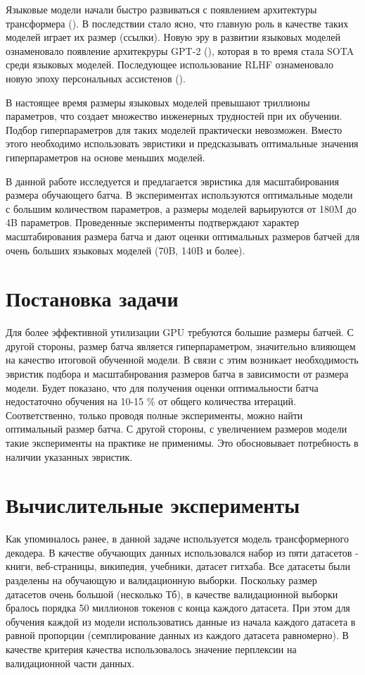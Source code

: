 \documentclass{article}
\begin{document}
\quad Языковые модели начали быстро развиваться с появлением архитектуры трансформера (\cite{vaswani2017attention}). В последствии стало ясно, что главную роль в качестве таких моделей играет их размер (ссылки). Новую эру в развитии языковых  моделей ознаменовало появление архитекруры GPT-2 (\cite{radford2019language}), которая в то время стала SOTA среди языковых моделей. Последующее использование RLHF ознаменовало новую эпоху персональных ассистенов (\cite{ouyang2022training}).


\quad В настоящее время размеры языковых моделей превышают триллионы параметров, что создает множество инженерных трудностей при их обучении. Подбор гиперпараметров для таких моделей практически невозможен. Вместо этого необходимо использовать эвристики и предсказывать оптимальные значения гиперпараметров на основе меньших моделей.

\quad В данной работе исследуется и предлагается эвристика для масштабирования размера обучающего батча. В экспериментах используются оптимальные модели с большим количеством параметров, а размеры моделей варьируются от 180M до 4B параметров. Проведенные эксперименты подтверждают характер масштабирования размера батча и дают оценки оптимальных размеров батчей для очень больших языковых моделей (70B, 140B и более).


\section{Постановка задачи}
\label{sec:headings}
Для более эффективной утилизации GPU требуются большие размеры батчей. С другой стороны, размер батча является гиперпараметром, значительно влияющем на качество итоговой обученной модели. В связи с этим возникает необходимость эвристик подбора и масштабирования размеров батча в зависимости от размера модели. Будет показано, что для получения оценки оптимальности батча недостаточно обучения на 10-15 \% от общего количества итераций. Соответственно, только проводя полные эксперименты, можно найти оптимальный размер батча. С другой стороны, с увеличением размеров модели такие эксперименты на практике не применимы. Это обосновывает потребность в наличии указанных эвристик.
\section{Вычислительные эксперименты}
Как упоминалось ранее, в данной задаче используется модель трансформерного декодера. В качестве обучающих данных  использовался набор из пяти датасетов - книги, веб-страницы, википедия, учебники, датасет гитхаба. Все датасеты были разделены на обучающую и валидационную выборки. Поскольку размер датасетов очень большой (несколько Тб), в качестве валидационной выборки бралось порядка 50 миллионов токенов с конца каждого датасета. При этом для обучения каждой из модели использоватись данные из начала каждого датасета в равной пропорции (семплирование данных из каждого датасета равномерно). В качестве критерия качества использовалось значение перплексии на валидационной части данных.
\end{document}
